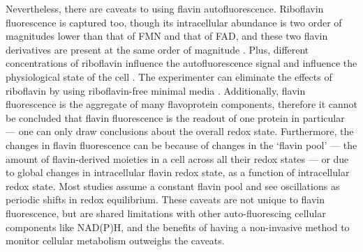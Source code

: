 Nevertheless, there are caveats to using flavin autofluorescence.
Riboflavin fluorescence is captured too, though its intracellular abundance is two order of magnitudes lower than that of FMN and that of FAD, and these two flavin derivatives are present at the same order of magnitude \parencite{tuCyclicChangesMetabolic2007}.
Plus, different concentrations of riboflavin influence the autofluorescence signal and influence the physiological state of the cell \parencite{maslankaAutofluorescenceYeastSaccharomyces2018}.
The experimenter can eliminate the effects of riboflavin by using riboflavin-free minimal media \parencite{verduynEffectBenzoicAcid1992}.
Additionally, flavin fluorescence is the aggregate of many flavoprotein components, therefore it cannot be concluded that flavin fluorescence is the readout of one protein in particular --- one can only draw conclusions about the overall redox state.
Furthermore, the changes in flavin fluorescence can be because of changes in the `flavin pool' --- the amount of flavin-derived moieties in a cell across all their redox states --- or due to global changes in intracellular flavin redox state, as a function of intracellular redox state.
Most studies assume a constant flavin pool and see oscillations as periodic shifts in redox equilibrium.
These caveats are not unique to flavin fluorescence, but are shared limitations with other auto-fluorescing cellular components like NAD(P)H, and the benefits of having a non-invasive method to monitor cellular metabolism outweighs the caveats.

